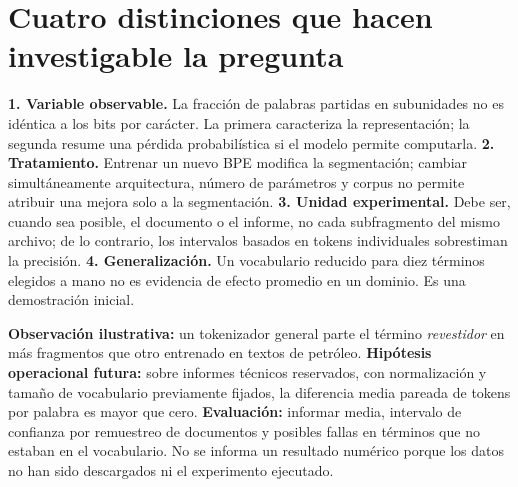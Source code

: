 \section*{Cuatro distinciones que hacen investigable la pregunta}
\textbf{1. Variable observable.} La fracción de palabras partidas en subunidades
no es idéntica a los bits por carácter. La primera caracteriza la representación;
la segunda resume una pérdida probabilística si el modelo permite computarla.
\textbf{2. Tratamiento.} Entrenar un nuevo BPE modifica la segmentación; cambiar
simultáneamente arquitectura, número de parámetros y corpus no permite atribuir
una mejora solo a la segmentación.
\textbf{3. Unidad experimental.} Debe ser, cuando sea posible, el documento o
el informe, no cada subfragmento del mismo archivo; de lo contrario,
los intervalos basados en tokens individuales sobrestiman la precisión.
\textbf{4. Generalización.} Un vocabulario reducido para diez términos elegidos a mano
no es evidencia de efecto promedio en un dominio. Es una demostración inicial.

\begin{ejemplo}
\textbf{Observación ilustrativa:} un tokenizador general parte el término
\emph{revestidor} en más fragmentos que otro entrenado en textos de petróleo.
\textbf{Hipótesis operacional futura:} sobre informes técnicos reservados,
con normalización y tamaño de vocabulario previamente fijados,
la diferencia media pareada de tokens por palabra es mayor que cero.
\textbf{Evaluación:} informar media, intervalo de confianza por remuestreo de
documentos y posibles fallas en términos que no estaban en el vocabulario.
No se informa un resultado numérico porque los datos no han sido descargados
ni el experimento ejecutado.
\end{ejemplo}

